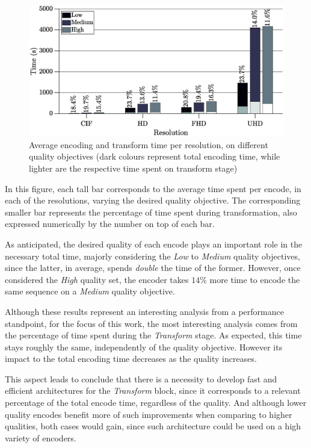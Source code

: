 \begin{figure}[!htpb]
    \centering
    \includegraphics[width=\textwidth]{Sections/3Transforms/Images/TimingAnalysisAvg.eps}
    \caption[Average encoding and transform time per resolution, on different quality objectives]{Average encoding and transform time per resolution, on different quality objectives (dark colours represent total encoding time, while lighter are the respective time spent on transform stage)}
    \label{fig:timeavg}
\end{figure}

In this figure, each tall bar corresponds to the average time spent per encode, in each of the resolutions, varying the desired quality objective. The corresponding smaller bar represents the percentage of time spent during transformation, also expressed numerically by the number on top of each bar.

As anticipated, the desired quality of each encode plays an important role in the necessary total time, majorly considering the \emph{Low} to \emph{Medium} quality objectives, since the latter, in average, spends \emph{double} the time of the former. However, once considered the \emph{High} quality set, the encoder takes $14 \%$ more time to encode the same sequence on a \emph{Medium} quality objective.

Although these results represent an interesting analysis from a performance standpoint, for the focus of this work, the most interesting analysis comes from the percentage of time spent during the \emph{Transform} stage. As expected, this time stays roughly the same, independently of the quality objective. However its impact to the total encoding time decreases as the quality increases. 

This aspect leads to conclude that there is a necessity to develop fast and efficient architectures for the \emph{Transform} block, since it corresponds to a relevant percentage of the total encode time, regardless of the quality. And although lower quality encodes benefit more of such improvements when comparing to higher qualities, both cases would gain, since such architecture could be used on a high variety of encoders.

